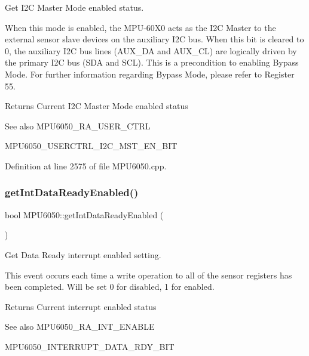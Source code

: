 Get I2C Master Mode enabled status. 

When this mode is enabled, the M\+P\+U-\/60\+X0 acts as the I2C Master to the external sensor slave devices on the auxiliary I2C bus. When this bit is cleared to 0, the auxiliary I2C bus lines (A\+U\+X\+\_\+\+DA and A\+U\+X\+\_\+\+CL) are logically driven by the primary I2C bus (S\+DA and S\+CL). This is a precondition to enabling Bypass Mode. For further information regarding Bypass Mode, please refer to Register 55. \begin{DoxyReturn}{Returns}
Current I2C Master Mode enabled status 
\end{DoxyReturn}
\begin{DoxySeeAlso}{See also}
M\+P\+U6050\+\_\+\+R\+A\+\_\+\+U\+S\+E\+R\+\_\+\+C\+T\+RL 

M\+P\+U6050\+\_\+\+U\+S\+E\+R\+C\+T\+R\+L\+\_\+\+I2\+C\+\_\+\+M\+S\+T\+\_\+\+E\+N\+\_\+\+B\+IT 
\end{DoxySeeAlso}


Definition at line 2575 of file M\+P\+U6050.\+cpp.

\mbox{\label{classMPU6050_ae15f6043a74c9c9bf9754824802ce8d3}} 
\subsubsection{\texorpdfstring{getIntDataReadyEnabled()}{getIntDataReadyEnabled()}}
{\footnotesize\ttfamily bool M\+P\+U6050\+::get\+Int\+Data\+Ready\+Enabled (\begin{DoxyParamCaption}{ }\end{DoxyParamCaption})}



Get Data Ready interrupt enabled setting. 

This event occurs each time a write operation to all of the sensor registers has been completed. Will be set 0 for disabled, 1 for enabled. \begin{DoxyReturn}{Returns}
Current interrupt enabled status 
\end{DoxyReturn}
\begin{DoxySeeAlso}{See also}
M\+P\+U6050\+\_\+\+R\+A\+\_\+\+I\+N\+T\+\_\+\+E\+N\+A\+B\+LE 

M\+P\+U6050\+\_\+\+I\+N\+T\+E\+R\+R\+U\+P\+T\+\_\+\+D\+A\+T\+A\+\_\+\+R\+D\+Y\+\_\+\+B\+IT 
\end{DoxySeeAlso}


